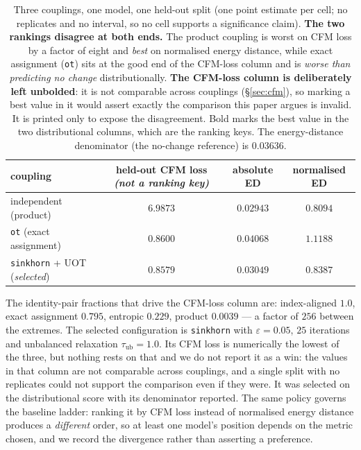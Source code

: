 \documentclass{article}
\begin{document}
\begin{table}[h]
\centering
\caption{Three couplings, one model, one held-out split (one point estimate per cell; no
replicates and no interval, so no cell supports a significance claim).
\textbf{The two rankings disagree at both ends.} The product coupling is worst on CFM loss by
a factor of eight and \emph{best} on normalised energy distance, while exact assignment
(\texttt{ot}) sits at the good end of the CFM-loss column and is \emph{worse than predicting
no change} distributionally. \textbf{The CFM-loss column is deliberately left unbolded}: it is
not comparable across couplings (\S\ref{sec:cfm}), so marking a best value in it would assert
exactly the comparison this paper argues is invalid. It is printed only to expose the
disagreement. Bold marks the best value in the two distributional columns, which are the
ranking keys. The energy-distance denominator (the no-change reference) is $0.03636$.}
\label{tab:coupling}
\begin{tabular}{lccc}
\toprule
coupling & held-out CFM loss \emph{(not a ranking key)} & absolute ED & normalised ED \\
\midrule
independent (product)                 & $6.9873$ & $\mathbf{0.02943}$ & $\mathbf{0.8094}$ \\
\texttt{ot} (exact assignment)        & $0.8600$ & $0.04068$ & $1.1188$ \\
\texttt{sinkhorn} + UOT (\emph{selected}) & $0.8579$ & $0.03049$ & $0.8387$ \\
\bottomrule
\end{tabular}
\end{table}

\noindent The identity-pair fractions that drive the CFM-loss column are: index-aligned
$1.0$, exact assignment $0.795$, entropic $0.229$, product $0.0039$ --- a factor of $256$
between the extremes. The selected
configuration is \texttt{sinkhorn} with $\varepsilon = 0.05$, $25$ iterations and unbalanced
relaxation $\tau_{\mathrm{ub}} = 1.0$. Its CFM loss is numerically the lowest of the three,
but nothing rests on that and we do not report it as a win: the values in that column are
not comparable across couplings, and a single split with no replicates could not support
the comparison even if they were. It was selected on the distributional
score with its denominator reported. The same policy governs the baseline
ladder: ranking it by CFM loss instead of normalised energy distance produces a
\emph{different} order, so at least one model's position depends on the metric chosen, and we
record the divergence rather than asserting a preference.
\end{document}
